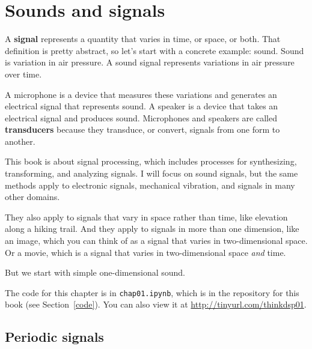 \documentclass[12pt]{book}
\begin{document}
\normalsize

\clearemptydoublepage

\begin{latexonly}

\tableofcontents

\clearemptydoublepage

\end{latexonly}

\mainmatter


\chapter{Sounds and signals}
\label{sounds}

A {\bf signal} represents a quantity that varies in time,
or space, or both.  That definition is pretty abstract, so let's start
with a concrete example: sound.  Sound is variation in air pressure.
A sound signal represents variations in air pressure over time.

A microphone is a device that measures these variations and generates
an electrical signal that represents sound.  A speaker is a device
that takes an electrical signal and produces sound.
Microphones and speakers are called {\bf transducers} because they
transduce, or convert, signals from one form to another.

This book is about signal processing, which includes processes for
synthesizing, transforming, and analyzing signals.  I will focus on
sound signals, but the same methods apply to electronic signals,
mechanical vibration, and signals in many other domains.

They also apply to signals that vary in space rather than time, like
elevation along a hiking trail.  And they apply to signals in more
than one dimension, like an image, which you can think of as a signal
that varies in two-dimensional space.  Or a movie, which is
a signal that varies in two-dimensional space {\it and} time.

But we start with simple one-dimensional sound.

The code for this chapter is in {\tt chap01.ipynb}, which is in the
repository for this book (see Section~\ref{code}).
You can also view it at \url{http://tinyurl.com/thinkdsp01}.


\section{Periodic signals}
\label{violin}
\end{document}

